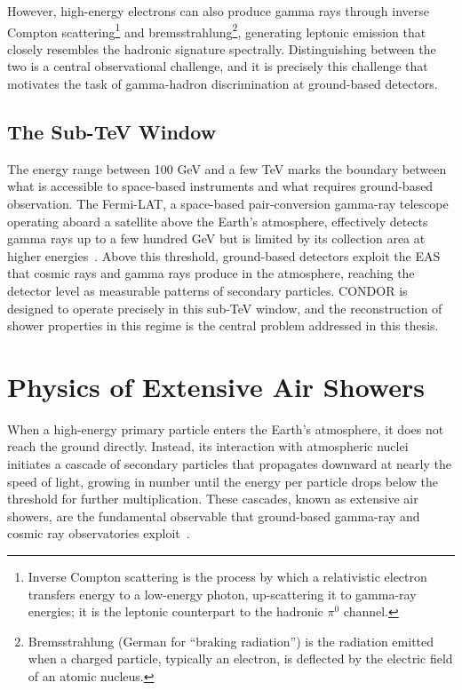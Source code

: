 However, high-energy electrons can also produce gamma rays through inverse Compton scattering\footnote{Inverse Compton scattering is the process by which a relativistic electron transfers energy to a low-energy photon, up-scattering it to gamma-ray energies; it is the leptonic counterpart to the hadronic $\pi^0$ channel.} and bremsstrahlung\footnote{Bremsstrahlung (German for ``braking radiation'') is the radiation emitted when a charged particle, typically an electron, is deflected by the electric field of an atomic nucleus.}, generating leptonic emission that closely resembles the hadronic signature spectrally. Distinguishing between the two is a central observational challenge, and it is precisely this challenge that motivates the task of gamma-hadron discrimination at ground-based detectors.

\subsection{The Sub-TeV Window}

The energy range between 100 GeV and a few TeV marks the boundary between what is accessible to space-based instruments and what requires ground-based observation. The Fermi-LAT, a space-based pair-conversion gamma-ray telescope 
operating aboard a satellite above the Earth’s atmosphere, effectively detects gamma rays up to a few hundred GeV but is limited by its collection area at higher energies~. Above this threshold, ground-based detectors exploit the EAS that cosmic rays and gamma rays produce in the atmosphere, reaching the detector level as measurable patterns of secondary particles. CONDOR is designed to operate precisely in this sub-TeV window, and the reconstruction of shower properties in this regime is the central problem addressed in this thesis.

\section{Physics of Extensive Air Showers}

When a high-energy primary particle enters the Earth's atmosphere, it does not reach the ground directly. Instead, its interaction with atmospheric nuclei initiates a cascade of secondary particles that propagates downward at nearly the speed of light, growing in number until the energy per particle drops below the threshold for further multiplication. These cascades, known as extensive air showers, are the fundamental observable that ground-based gamma-ray and cosmic ray observatories exploit~.

